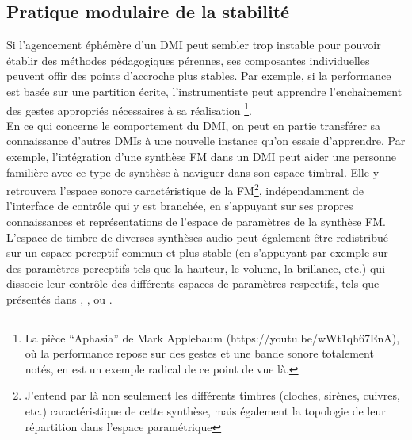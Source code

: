 \subsection{Pratique modulaire de la stabilité}

\noindent Si l'agencement éphémère d'un \gls{DMI} peut sembler trop instable pour pouvoir établir des méthodes pédagogiques pérennes, ses composantes individuelles peuvent offir des points d'accroche plus stables. Par exemple, si la performance est basée sur une partition écrite, l'instrumentiste peut apprendre l'enchaînement des gestes appropriés nécessaires à sa réalisation \footnote{La pièce ``Aphasia'' de Mark Applebaum (https://youtu.be/wWt1qh67EnA), où la performance repose sur des gestes et une bande sonore totalement notés, en est un exemple radical de ce point de vue là.}.\\
\indent En ce qui concerne le comportement du \gls{DMI}, on peut en partie transférer sa connaissance d'autres \glspl{DMI} à une nouvelle instance qu'on essaie d'apprendre. Par exemple, l'intégration d'une synthèse \gls{FM} dans un \gls{DMI} peut aider une personne familière avec ce type de synthèse à naviguer dans son espace timbral. Elle y retrouvera l'espace sonore caractéristique de la \gls{FM}\footnote{J'entend par là non seulement les différents timbres (cloches, sirènes, cuivres, etc.) caractéristique de cette synthèse, mais également la topologie de leur répartition dans l'espace paramétrique}, indépendamment de l'interface de contrôle qui y est branchée, en s'appuyant sur ses propres connaissances et représentations de l'espace de paramètres de la synthèse \gls{FM}. L'espace de timbre de diverses synthèses audio peut également être redistribué sur un espace perceptif commun et plus stable (en s'appuyant par exemple sur des paramètres perceptifs tels que la hauteur, le volume, la brillance, etc.) qui dissocie leur contrôle des différents espaces de paramètres respectifs, tels que présentés dans \cite{wessel_timbre_1979}, \cite{arfib_strategies_2002}, \cite{schwarz_sound_2012} ou \cite{tubb_divergent_2014}.

